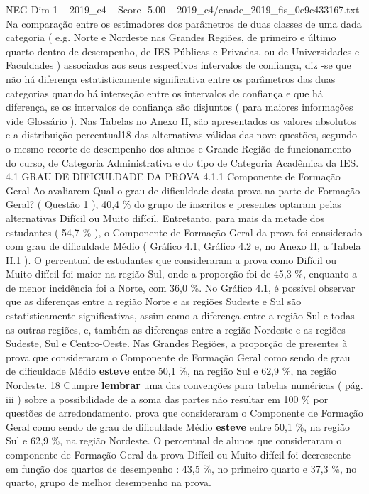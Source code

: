 \begin{textsample}{NEG Dim 1 – 2019\_c4 – Score -5.00 – 2019\_c4/enade\_2019\_fis\_0e9c433167.txt}
Na comparação entre os estimadores dos parâmetros de duas classes de uma dada categoria ( e.g.
Norte e Nordeste nas Grandes Regiões, de primeiro e último quarto dentro de desempenho, de IES Públicas e Privadas, ou de Universidades e Faculdades ) associados aos seus respectivos intervalos de confiança, diz -se que não há diferença estatisticamente significativa entre os parâmetros das duas categorias quando há interseção entre os intervalos de confiança e que há diferença, se os intervalos de confiança são disjuntos ( para maiores informações vide Glossário ).
Nas Tabelas no Anexo II, são apresentados os valores absolutos e a distribuição percentual18 das alternativas válidas das nove questões, segundo o mesmo recorte de desempenho dos alunos e Grande Região de funcionamento do curso, de Categoria Administrativa e do tipo de Categoria Acadêmica da IES. 4.1 GRAU DE DIFICULDADE DA PROVA 4.1.1 Componente de Formação Geral Ao avaliarem Qual o grau de dificuldade desta prova na parte de Formação Geral? ( Questão 1 ), 40,4 \% do grupo de inscritos e presentes optaram pelas alternativas Difícil ou Muito difícil.
Entretanto, para mais da metade dos estudantes ( 54,7 \% ), o Componente de Formação Geral da prova foi considerado com grau de dificuldade Médio ( Gráfico 4.1, Gráfico 4.2 e, no Anexo II, a Tabela II.1 ).
O percentual de estudantes que consideraram a prova como Difícil ou Muito difícil foi maior na região Sul, onde a proporção foi de 45,3 \%, enquanto a de menor incidência foi a Norte, com 36,0 \%.
No Gráfico 4.1, é possível observar que as diferenças entre a região Norte e as regiões Sudeste e Sul são estatisticamente significativas, assim como a diferença entre a região Sul e todas as outras regiões, e, também as diferenças entre a região Nordeste e as regiões Sudeste, Sul e Centro-Oeste.
Nas Grandes Regiões, a proporção de presentes à prova que consideraram o Componente de Formação Geral como sendo de grau de dificuldade Médio \textbf{esteve} entre 50,1 \%, na região Sul e 62,9 \%, na região Nordeste. 18 Cumpre \textbf{lembrar} uma das convenções para tabelas numéricas ( pág. iii ) sobre a possibilidade de a soma das partes não resultar em 100 \% por questões de arredondamento. prova que consideraram o Componente de Formação Geral como sendo de grau de dificuldade Médio \textbf{esteve} entre 50,1 \%, na região Sul e 62,9 \%, na região Nordeste.
O percentual de alunos que consideraram o componente de Formação Geral da prova Difícil ou Muito difícil foi decrescente em função dos quartos de desempenho : 43,5 \%, no primeiro quarto e 37,3 \%, no quarto, grupo de melhor desempenho na prova.

\end{textsample}
